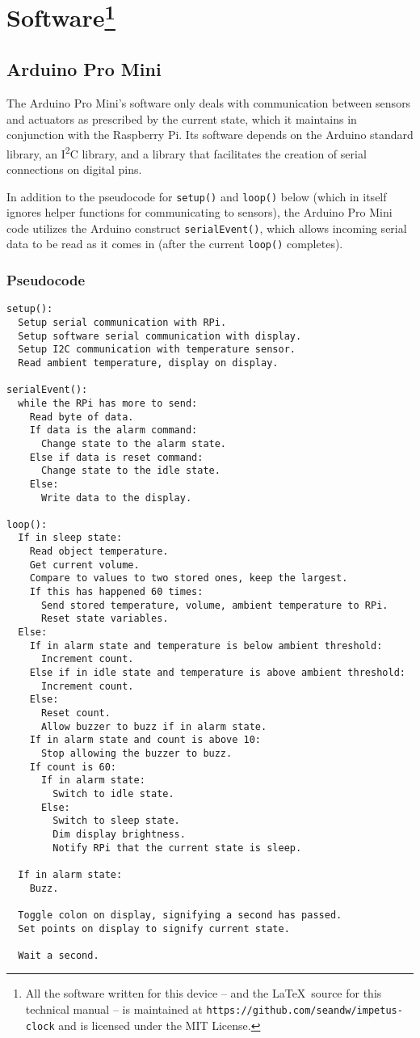 \chapter[Software]{Software\footnote{All the software written for this
  device -- and the \LaTeX~source for this technical manual -- is
  maintained at \texttt{https://github.com/seandw/impetus-clock} and
  is licensed under the MIT License.}}

\section{Arduino Pro Mini}
The Arduino Pro Mini's software only deals with communication between
sensors and actuators as prescribed by the current state, which it
maintains in conjunction with the Raspberry Pi. Its software depends
on the Arduino standard library, an I\textsuperscript{2}C library, and
a library that facilitates the creation of serial connections on
digital pins.

In addition to the pseudocode for \verb|setup()| and \verb|loop()|
below (which in itself ignores helper functions for communicating to
sensors), the Arduino Pro Mini code utilizes the Arduino construct
\verb|serialEvent()|, which allows incoming serial data to be read as
it comes in (after the current \verb|loop()| completes).

\subsection{Pseudocode}
\begin{verbatim}
setup():
  Setup serial communication with RPi.
  Setup software serial communication with display.
  Setup I2C communication with temperature sensor.
  Read ambient temperature, display on display.

serialEvent():
  while the RPi has more to send:
    Read byte of data.
    If data is the alarm command:
      Change state to the alarm state.
    Else if data is reset command:
      Change state to the idle state.
    Else:
      Write data to the display.

loop():
  If in sleep state:
    Read object temperature.
    Get current volume.
    Compare to values to two stored ones, keep the largest.
    If this has happened 60 times:
      Send stored temperature, volume, ambient temperature to RPi.
      Reset state variables.
  Else:
    If in alarm state and temperature is below ambient threshold:
      Increment count.
    Else if in idle state and temperature is above ambient threshold:
      Increment count.
    Else:
      Reset count.
      Allow buzzer to buzz if in alarm state.
    If in alarm state and count is above 10:
      Stop allowing the buzzer to buzz.
    If count is 60:
      If in alarm state:
        Switch to idle state.
      Else:
        Switch to sleep state.
        Dim display brightness.
        Notify RPi that the current state is sleep.

  If in alarm state:
    Buzz.

  Toggle colon on display, signifying a second has passed.
  Set points on display to signify current state.

  Wait a second.
\end{verbatim}

